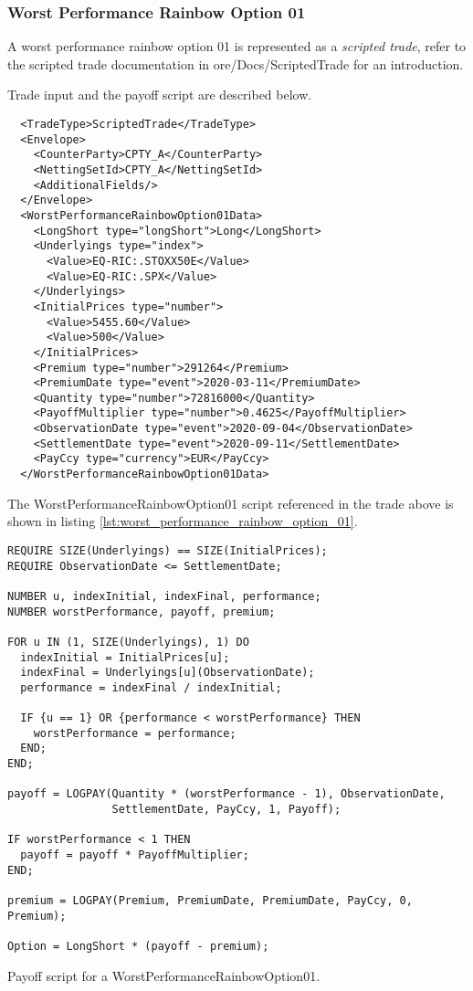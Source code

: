 \subsubsection*{Worst Performance Rainbow Option 01}

A worst performance rainbow option 01 is represented as a {\em scripted trade},
refer to the scripted trade documentation in ore/Docs/ScriptedTrade
for an introduction.

Trade input and the payoff script are described below.

\begin{verbatim}
  <TradeType>ScriptedTrade</TradeType>
  <Envelope>
    <CounterParty>CPTY_A</CounterParty>
    <NettingSetId>CPTY_A</NettingSetId>
    <AdditionalFields/>
  </Envelope>
  <WorstPerformanceRainbowOption01Data>
    <LongShort type="longShort">Long</LongShort>
    <Underlyings type="index">
      <Value>EQ-RIC:.STOXX50E</Value>
      <Value>EQ-RIC:.SPX</Value>
    </Underlyings>
    <InitialPrices type="number">
      <Value>5455.60</Value>
      <Value>500</Value>
    </InitialPrices>
    <Premium type="number">291264</Premium>
    <PremiumDate type="event">2020-03-11</PremiumDate>
    <Quantity type="number">72816000</Quantity>
    <PayoffMultiplier type="number">0.4625</PayoffMultiplier>
    <ObservationDate type="event">2020-09-04</ObservationDate>
    <SettlementDate type="event">2020-09-11</SettlementDate>
    <PayCcy type="currency">EUR</PayCcy>
  </WorstPerformanceRainbowOption01Data>
\end{verbatim}

The WorstPerformanceRainbowOption01 script referenced in the trade above is shown in listing
\ref{lst:worst_performance_rainbow_option_01}.

\begin{listing}[hbt]
\begin{verbatim}
REQUIRE SIZE(Underlyings) == SIZE(InitialPrices);
REQUIRE ObservationDate <= SettlementDate;

NUMBER u, indexInitial, indexFinal, performance;
NUMBER worstPerformance, payoff, premium;

FOR u IN (1, SIZE(Underlyings), 1) DO
  indexInitial = InitialPrices[u];
  indexFinal = Underlyings[u](ObservationDate);
  performance = indexFinal / indexInitial;

  IF {u == 1} OR {performance < worstPerformance} THEN
    worstPerformance = performance;
  END;
END;

payoff = LOGPAY(Quantity * (worstPerformance - 1), ObservationDate,
                SettlementDate, PayCcy, 1, Payoff);

IF worstPerformance < 1 THEN
  payoff = payoff * PayoffMultiplier;
END;

premium = LOGPAY(Premium, PremiumDate, PremiumDate, PayCcy, 0, Premium);

Option = LongShort * (payoff - premium);
\end{verbatim}
\caption{Payoff script for a WorstPerformanceRainbowOption01.}
\label{lst:worst_performance_rainbow_option_01}
\end{listing}

